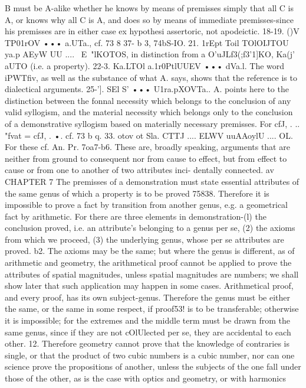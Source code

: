 {{{{{{{{{B must be A-alike whether he knows by means of premisses
simply that all C is A, or knows why all C is A, and does so by
means of immediate premisses-since his premisses are in either
case ex hypothesi assertoric, not apodeictic.
18-19. ()V TP01rOV ••• a.UTa., cf. 73 8 37- b 3, 74bS-IO.
21. 1rEpt Toil TOlOIJTOU ya.p AEyW UU .... ~E~"lKOTOS, in distinction
from a O'uJLf3(;f3'1]KO, Ka(j' aUTO (i.e. a property).
22-3. Ka.LTOl a.1r0PtlUUEV ••• dVa.l. The word iPWTfiv, as well as
the substance of what A. says, shows that the reference is to
dialectical arguments.
25-']. SEl S' ••• U1ra.pXOVTa.. A. points here to the distinction
between the fonnal necessity which belongs to the conclusion
of any valid syllogism, and the material necessity which belongs
only to the conclusion of a demonstrative syllogism based on
materially necessary premisses.
For cfJ, . .. "fvat = cfJ, . •. cf. 73 b q.
33. otov ot Sla. CTTJ .... ELWV uuAAoylU .... OL. For these cf. An. Pr.
7oa7-b6. These are, broadly speaking, arguments that are neither
from ground to consequent nor from cause to effect, but from
effect to cause or from one to another of two attributes inci-
dentally connected.
av
CHAPTER 7
The premisses of a demonstration must state essential attributes of
the same genus of which a property is to be proved
75838. Therefore it is impossible to prove a fact by transition
from another genus, e.g. a geometrical fact by arithmetic. For
there are three elements in demonstration-(l) the conclusion
proved, i.e. an attribute's belonging to a genus per se, (2) the
axioms from which we proceed, (3) the underlying genus, whose
per se attributes are proved.
b2. The axioms may be the same; but where the genus is
different, as of arithmetic and geometry, the arithmetical proof
cannot be applied to prove the attributes of spatial magnitudes,
unless spatial magnitudes are numbers; we shall show later that
such application may happen in some cases. Arithmetical proof,
and every proof, has its own subject-genus. Therefore the genus
must be either the same, or the same in some respect, if proof53!
is to be transferable; otherwise it is impossible; for the extremes
and the middle term must be drawn from the same genus, since
if they are not cOlUlected per se, they are accidental to each other.
12. Therefore geometry cannot prove that the knowledge of
contraries is single, or that the product of two cubic numbers is a
cubic number, nor can one science prove the propositions of
another, unless the subjects of the one fall under those of the
other, as is the case with optics and geometry, or with harmonics
}}}}}}}}}
